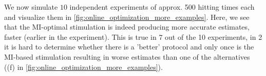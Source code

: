 \clearpage

We now simulate $10$ independent experiments of approx. 500 hitting times each
and visualize them in \cref{fig:online_optimization_more_examples}. Here, we see
that the MI-optimal stimulation is indeed producing more accurate
estimates, faster (earlier in the experiment). This is true in 7 out of the 10
experiments, in 2 it is hard to determine whether there is a 'better' protocol
and only once is the MI-based stimulation resulting in worse estimates than one
of the alternatives ((f) in \cref{fig:online_optimization_more_examples}). 
 
\begin{figure}[h]
\begin{center}
\\
\end{center}
\end{figure}
